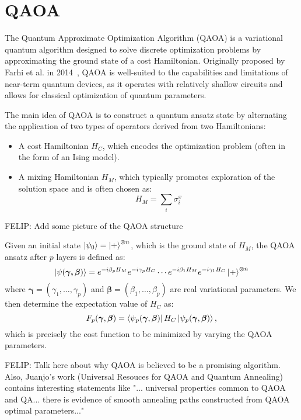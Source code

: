 \section{QAOA}
\label{Section:QAOA}

The Quantum Approximate Optimization Algorithm (QAOA) is a variational quantum algorithm
designed to solve discrete optimization problems by approximating the ground state of a cost Hamiltonian.
Originally proposed by Farhi et al. in 2014~\cite{farhi_quantum_2014}, QAOA is well-suited to the capabilities
and limitations of near-term quantum devices, as it operates with relatively shallow circuits
and allows for classical optimization of quantum parameters.

The main idea of QAOA is to construct a quantum ansatz state by alternating the application of
two types of operators derived from two Hamiltonians:
\begin{itemize}
    \item A cost Hamiltonian $H_C$, which encodes the optimization problem (often
    in the form of an Ising model).
    \item A mixing Hamiltonian $H_M$, which typically promotes exploration of the solution
    space and is often chosen as:
    \begin{equation}
        H_M = \sum_i \sigma_i^x
        \label{eq:mixing_hamiltonian}
    \end{equation}
\end{itemize}

{\color{red} FELIP: Add some picture of the QAOA structure}

Given an initial state $\ket{\psi_0} = \ket{+}^{\otimes n}$, which is the ground state of
$H_M$, the QAOA ansatz after $p$ layers is defined as:
\begin{equation}
    \ket{\psi(\bm{\gamma, \beta})} = e^{-i \beta_p H_M} e^{- i \gamma_p H_C} \cdots
    e^{-i \beta_1 H_M} e^{- i \gamma_1 H_C} \ket{+}^{\otimes n}
\end{equation}
where $\bm{\gamma} = (\gamma_1, \dots, \gamma_p)$ and $\bm{\beta} = (\beta_1, \dots, \beta_p)$
are real variational parameters. We then determine the expectation value of $H_C$ as:
\begin{equation}
    F_p (\bm{\gamma}, \bm{\beta}) = \bra{\psi_p (\bm{\gamma}, \bm{\beta})} H_C \ket{\psi_p (\bm{\gamma}, \bm{\beta})},
    \label{eq:cost_function}
\end{equation}
which is precisely the cost function to be minimized by varying the QAOA parameters.

{\color{red} FELIP: Talk here about why QAOA is believed to be a promising algorithm. Also,
Juanjo's work (Universal Resouces for QAOA and Quantum Annealing) contains interesting
statements like "... universal properties common to QAOA and QA... there is evidence
of smooth annealing paths constructed from QAOA optimal parameters..."}

\cite{zhou_quantum_2020}